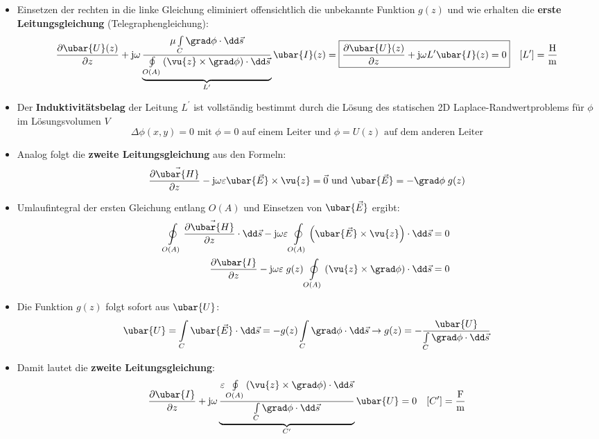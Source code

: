 \begin{itemize}
\begin{equation}
	\end{equation}
	\item Einsetzen der rechten in die linke Gleichung eliminiert offensichtlich die unbekannte Funktion \(g(z)\) und wie erhalten die \textbf{erste Leitungsgleichung} (Telegraphengleichung):
	\begin{equation}
		\frac{\partial  \ubar{U}(z)}{\partial z} + \mathrm{j}\omega \underbrace{\frac{\mu\int\limits_C\grad \phi \cdot \dd \vec{s}}{\oint\limits_{O(A)} \left(\vu{z}\times\grad \phi\right) \cdot \dd\vec{s}}}_{L^\prime}  \ubar{I}(z)=\boxed{\frac{\partial  \ubar{U}(z)}{\partial z} + \mathrm{j}\omega L^\prime  \ubar{I}(z)= 0} \quad [L^\prime] = \mathrm{\frac{H}{m}}
	\end{equation}
	\item Der \textbf{Induktivitätsbelag} der Leitung \(L^\prime\) ist vollständig bestimmt durch die Lösung des statischen 2D Laplace-Randwertproblems für \(\phi\) im Lösungsvolumen \(V\)
	\begin{equation}
		\Delta \phi(x,y) = 0 \text{ mit }  \phi = 0 \text{ auf einem Leiter und } \phi =  U(z) \text{ auf dem anderen Leiter}
	\end{equation}
	
	\item Analog folgt die \textbf{zweite Leitungsgleichung} aus den Formeln:
	\begin{equation}
		\frac{\partial \vec{\ubar{H}}}{\partial z} - \mathrm{j}\omega\varepsilon\ubar{\vec{E}} \times\vu{z} =\vec{0} \text{ und } \ubar{\vec{E}} = -\grad \phi \; g(z)
	\end{equation}
	\item Umlaufintegral der ersten Gleichung entlang \(O(A)\) und Einsetzen von \(\ubar{\vec{E}}\) ergibt:
	\begin{equation}\begin{split}
			\oint\limits_{O(A)} \frac{\partial \vec{\ubar{H}}}{\partial z} \cdot \dd \vec{s} - \mathrm{j}\omega\varepsilon \oint\limits_{O(A)}\left(\ubar{\vec{E}} \times\vu{z}\right) \cdot \dd \vec{s} &= 0  \\
			\frac{\partial  \ubar{I}}{\partial z} -\mathrm{j}\omega\varepsilon\; g(z) \oint\limits_{O(A)}\left(\vu{z}\times \grad \phi\right) \cdot \dd \vec{s} &= 0
	\end{split}\end{equation}
	\item Die Funktion \(g(z)\) folgt sofort aus \( \ubar{U}\):
	\begin{equation}
		\ubar{U} = \int\limits_C \ubar{\vec{E}}\cdot\dd\vec{s} = -g(z) \int\limits_C \grad \phi\cdot\dd\vec{s} \to g(z) = -\frac{ \ubar{U}}{\int\limits_C \grad \phi\cdot\dd\vec{s}}
	\end{equation}
	\item Damit lautet die \textbf{zweite Leitungsgleichung}:
	\begin{equation}
		\frac{\partial  \ubar{I}}{\partial z} +\mathrm{j}\omega \underbrace{\frac{\varepsilon\oint\limits_{O(A)}\left(\vu{z}\times \grad \phi\right) \cdot \dd \vec{s}}{\int\limits_C \grad \phi\cdot\dd\vec{s}}}_{C^\prime}  \ubar{U} = 0 \quad [C^\prime]=\mathrm{\frac{F}{m}}
	\end{equation}
\end{itemize}
